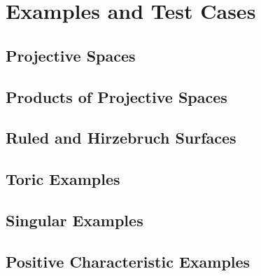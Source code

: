 \section{Examples and Test Cases}

\subsection{Projective Spaces}

\subsection{Products of Projective Spaces}

\subsection{Ruled and Hirzebruch Surfaces}

\subsection{Toric Examples}

\subsection{Singular Examples}

\subsection{Positive Characteristic Examples}
